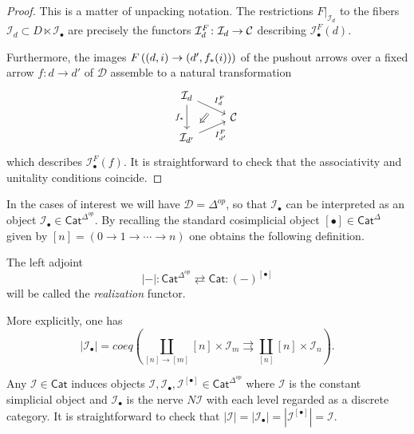 \documentclass[a4paper,10pt]{article}%
\begin{document}
\begin{proof}
	This is a matter of unpacking notation. The restrictions 
	$F|_{\mathcal{I}_d}$ to the fibers 
	$\mathcal{I}_d \subset D \ltimes \mathcal{I}_{\bullet}$
	are precisely the functors 
	$\mathcal{I}^F_d \colon \mathcal{I}_d \to \mathcal{C}$ describing $\mathcal{I}_{\bullet}^F(d)$.
	
	Furthermore, the images
	$F \left( (d,i) \to (d',f_{\**}(i)) \right)$	
	of the pushout arrows over a fixed arrow $f \colon d \to d'$ of $\mathcal{D}$
assemble to a natural transformation 
\begin{equation}
	\begin{tikzcd}[row sep=0.4em]
		\mathcal{I}_d 
		\ar{dr}[name=F1]{I_d^F} \ar{dd}[swap]{f_{\**}} &
	\\
 & \C 
	\\
|[alias=G2]| \mathcal{I}_{d'}  \ar{ur}[swap]{I_{d'}^F} & 
		\arrow[Rightarrow, from=F1, to=G2,shorten >=0.25cm,shorten <=0.25cm]
	\end{tikzcd}
\end{equation}
which describes $\mathcal{I}_{\bullet}^F(f)$. It is straightforward to check that the associativity and unitality conditions coincide.
\end{proof}


In the cases of interest we will have $\mathcal{D}=\Delta^{op}$,
so that $\mathcal{I}_{\bullet}$ can be interpreted as an object $\mathcal{I}_{\bullet} \in \mathsf{Cat}^{\Delta^{op}}$.
By recalling the standard cosimplicial object
$[\bullet] \in \mathsf{Cat}^{\Delta}$ given by 
$[n]=(0 \to 1 \to \cdots \to n)$
one obtains the following definition.


\begin{definition}
	The left adjoint
	\[
	|\minus|\colon
	\mathsf{Cat}^{\Delta^{op}} 
		\rightleftarrows
	\mathsf{Cat} 
	\colon (\minus)^{[\bullet]}
	\]
	will be called the \textit{realization} functor.
\end{definition}


\begin{remark}
More explicitly, one has
\begin{equation}\label{REALDEF EQ}
	 |\mathcal{I}_{\bullet}| =
	 coeq \left(\coprod_{[n] \to [m]}
	 [n] \times \mathcal{I}_m
	 	\rightrightarrows
	 \coprod_{[n]} [n] \times \mathcal{I}_n
	 \right).
\end{equation}
\end{remark}

\begin{example}
Any $\mathcal{I} \in \mathsf{Cat}$ induces objects 
$\mathcal{I},\mathcal{I}_{\bullet},\mathcal{I}^{[\bullet]} \in \mathsf{Cat}^{\Delta^{op}}$ 
where $\mathcal{I}$ is the constant simplicial object and $\mathcal{I}_{\bullet}$ is the nerve $N \mathcal{I}$ with each level regarded as a discrete category.
It is straightforward to check that 
$|\mathcal{I}|=|\mathcal{I}_{\bullet}| =
|\mathcal{I}^{[\bullet]}| = \mathcal{I}$.
\end{example}
\end{document}
